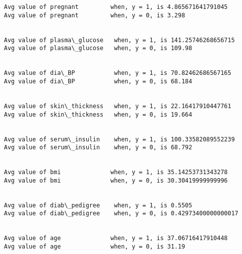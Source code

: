 \documentclass[11pt]{article}
\begin{document}
    \begin{Verbatim}[commandchars=\\\{\}]
Avg value of pregnant         when, y = 1, is 4.865671641791045
Avg value of pregnant         when, y = 0, is 3.298


Avg value of plasma\_glucose   when, y = 1, is 141.25746268656715
Avg value of plasma\_glucose   when, y = 0, is 109.98


Avg value of dia\_BP           when, y = 1, is 70.82462686567165
Avg value of dia\_BP           when, y = 0, is 68.184


Avg value of skin\_thickness   when, y = 1, is 22.16417910447761
Avg value of skin\_thickness   when, y = 0, is 19.664


Avg value of serum\_insulin    when, y = 1, is 100.33582089552239
Avg value of serum\_insulin    when, y = 0, is 68.792


Avg value of bmi              when, y = 1, is 35.14253731343278
Avg value of bmi              when, y = 0, is 30.30419999999996


Avg value of diab\_pedigree    when, y = 1, is 0.5505
Avg value of diab\_pedigree    when, y = 0, is 0.42973400000000017


Avg value of age              when, y = 1, is 37.06716417910448
Avg value of age              when, y = 0, is 31.19


    \end{Verbatim}
\end{document}
